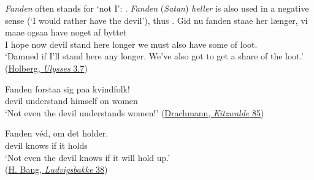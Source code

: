 \textit{Fanden} often stands for `not I': . \textit{Fanden} (\textit{Satan})\textit{ heller} is also used in a negative sense (`I would rather have the devil'), thus . %
\ea \label{ex:04-220}
\ea
\gll Gid nu fanden staae her {længer}, vi maae ogsaa have noget af byttet\\
 {I hope} now devil stand here longer we must also have some of loot.\DEF{}\\
\glt `Damned if I'll stand here any longer. We've also got to get a share of the loot.'
\hfill(\href{http://holbergsskrifter.dk/holberg-public/view?docId=skuespill%2FUlysses%2FUlysses.page&chunk.id=act3sc7&show.second=&toc.depth=1&toc.id=act3}{Holberg, \textit{Ulysses} 3.7}) %

\ex
\gll Fanden forstaa sig paa kvindfolk!\\
 devil understand himself on women\\
\glt `Not even the devil understands women!'
\hfill(\href{https://archive.org/details/samledepoetiske04dracgoog/page/206/mode/2up?q=\%22fanden+forstaa+sig+paa+kvindfolk\%22&view=theater}{Drachmann, \textit{Kitzwalde} 85})

\ex
\gll Fanden véd, om det holder.\\
 devil knows if it holds\\
\glt `Not even the devil knows if it will hold up.'
\\\hfill(\href{https://www.gutenberg.org/cache/epub/10829/pg10829-images.html}{H. Bang, \textit{Ludvigsbakke} 38})

